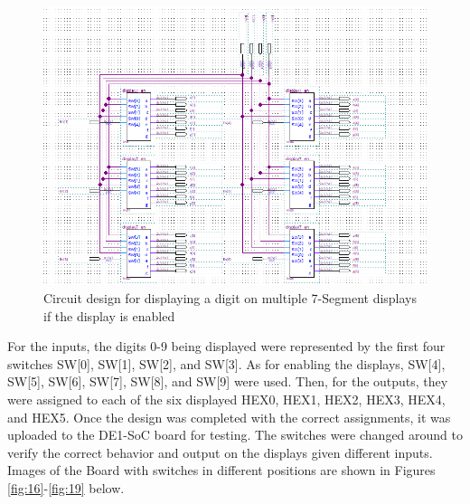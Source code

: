 \documentclass[
	letterpaper, %
	10pt, %
]{CSUniSchoolLabReport}
\begin{document}
\begin{figure}[H]
  \centering
  \includegraphics[width=.9\textwidth]{Figures/display_control.png}
  \caption{Circuit design for displaying a digit on multiple 7-Segment displays if the display is enabled}
  \label{fig:15}
\end{figure}

For the inputs, the digits 0-9 being displayed were represented by the first four switches SW[0], SW[1], SW[2], and SW[3]. As for enabling the displays, SW[4], SW[5], SW[6], SW[7], SW[8], and SW[9] were used. Then, for the outputs, they were assigned to each of the six displayed HEX0, HEX1, HEX2, HEX3, HEX4, and HEX5. Once the design was completed with the correct assignments, it was uploaded to the DE1-SoC board for testing. The switches were changed around to verify the correct behavior and output on the displays given different inputs. Images of the Board with switches in different positions are shown in Figures \ref{fig:16}-\ref{fig:19} below. 
\end{document}
